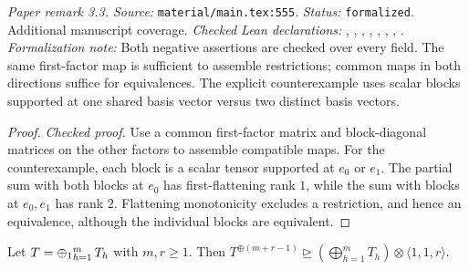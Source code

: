 \noindent\textit{Paper remark 3.3. Source:} \texttt{material/main.tex:555}.
\textit{Status:} \texttt{formalized}. Additional manuscript coverage.
\textit{Checked Lean declarations:} , , , , , , , .
\textit{Formalization note:} Both negative assertions are checked over every field. The same first-factor map is sufficient to assemble restrictions; common maps in both directions suffice for equivalences. The explicit counterexample uses scalar blocks supported at one shared basis vector versus two distinct basis vectors.

\begin{proof}
\leanok
{}
\textit{Checked proof.} Use a common first-factor matrix and block-diagonal matrices on the other factors to assemble compatible maps. For the counterexample, each block is a scalar tensor supported at $e_0$ or $e_1$. The partial sum with both blocks at $e_0$ has first-flattening rank $1$, while the sum with blocks at $e_0,e_1$ has rank $2$. Flattening monotonicity excludes a restriction, and hence an equivalence, although the individual blocks are equivalent.
\end{proof}

\renewcommand{\thetheorem}{3.4}
\begin{lemma}
\label{lem:diamond-plus-deg}
\manuscriptproof
{}
\leanok
Let $T=\mathop{\mathbin{\oplus_1}}_{h=1}^mT_h$ with $m,r\ge1$. Then $T^{\oplus(m+r-1)}\trianglerighteq(\bigoplus_{h=1}^mT_h)\otimes\langle1,1,r\rangle$.
\end{lemma}

